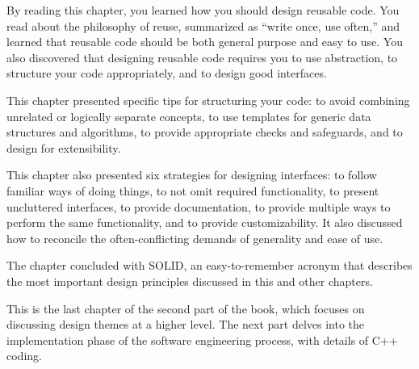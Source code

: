By reading this chapter, you learned how you should design reusable code. You read about the philosophy of reuse, summarized as “write once, use often,” and learned that reusable code should be both general purpose and easy to use. You also discovered that designing reusable code requires you to use abstraction, to structure your code appropriately, and to design good interfaces.

This chapter presented specific tips for structuring your code: to avoid combining unrelated or logically separate concepts, to use templates for generic data structures and algorithms, to provide appropriate checks and safeguards, and to design for extensibility.

This chapter also presented six strategies for designing interfaces: to follow familiar ways of doing things, to not omit required functionality, to present uncluttered interfaces, to provide documentation, to provide multiple ways to perform the same functionality, and to provide customizability. It also discussed how to reconcile the often-conflicting demands of generality and ease of use.

The chapter concluded with SOLID, an easy-to-remember acronym that describes the most important design principles discussed in this and other chapters.

This is the last chapter of the second part of the book, which focuses on discussing design themes at a higher level. The next part delves into the implementation phase of the software engineering process, with details of C++ coding.